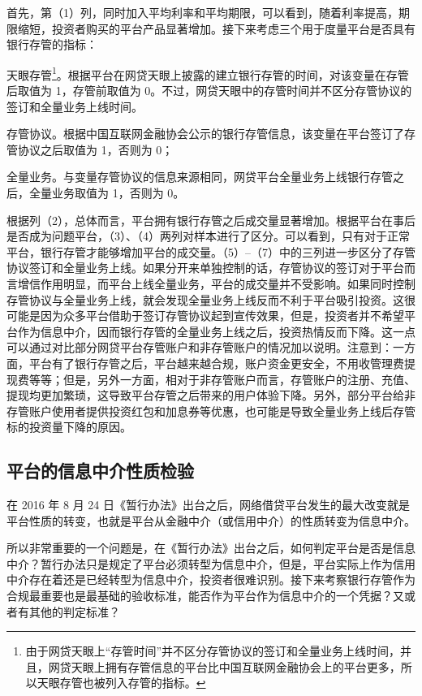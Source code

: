 \documentclass[lang=cn,11pt,authoryear]{elegantpaper}
\begin{document}
首先，第（1）列，同时加入平均利率和平均期限，可以看到，随着利率提高，期限缩短，投资者购买的平台产品显著增加。接下来考虑三个用于度量平台是否具有银行存管的指标：
\begin{enumerate*}[label=（\arabic*）]
    \item 天眼存管\footnote{由于网贷天眼上“存管时间”并不区分存管协议的签订和全量业务上线时间，并且，网贷天眼上拥有存管信息的平台比中国互联网金融协会上的平台更多，所以天眼存管也被列入存管的指标。}。根据平台在网贷天眼上披露的建立银行存管的时间，对该变量在存管后取值为 1，存管前取值为 0。不过，网贷天眼中的存管时间并不区分存管协议的签订和全量业务上线时间。
    \item 存管协议。根据中国互联网金融协会公示的银行存管信息，该变量在平台签订了存管协议之后取值为 1，否则为 0；
    \item 全量业务。与变量存管协议的信息来源相同，网贷平台全量业务上线银行存管之后，全量业务取值为 1，否则为 0。
\end{enumerate*}

根据列（2），总体而言，平台拥有银行存管之后成交量显著增加。根据平台在事后是否成为问题平台，（3）、（4）两列对样本进行了区分。可以看到，只有对于正常平台，银行存管才能够增加平台的成交量。（5）--（7）中的三列进一步区分了存管协议签订和全量业务上线。如果分开来单独控制的话，存管协议的签订对于平台而言增信作用明显，而平台上线全量业务，平台的成交量并不受影响。如果同时控制存管协议与全量业务上线，就会发现全量业务上线反而不利于平台吸引投资。这很可能是因为众多平台借助于签订存管协议起到宣传效果，但是，投资者并不希望平台作为信息中介，因而银行存管的全量业务上线之后，投资热情反而下降。这一点可以通过对比部分网贷平台存管账户和非存管账户的情况加以说明。注意到：一方面，平台有了银行存管之后，平台越来越合规，账户资金更安全，不用收管理费提现费等等；但是，另外一方面，相对于非存管账户而言，存管账户的注册、充值、提现均更加繁琐，这导致平台存管之后带来的用户体验下降。另外，部分平台给非存管账户使用者提供投资红包和加息券等优惠，也可能是导致全量业务上线后存管标的投资量下降的原因。

\subsection{平台的信息中介性质检验}

在 2016 年 8 月 24 日《暂行办法》出台之后，网络借贷平台发生的最大改变就是平台性质的转变，也就是平台从金融中介（或信用中介）的性质转变为信息中介。

所以非常重要的一个问题是，在《暂行办法》出台之后，如何判定平台是否是信息中介？暂行办法只是规定了平台必须转型为信息中介，但是，平台实际上作为信用中介存在着还是已经转型为信息中介，投资者很难识别。接下来考察银行存管作为合规最重要也是最基础的验收标准，能否作为平台作为信息中介的一个凭据？又或者有其他的判定标准？
\end{document}

